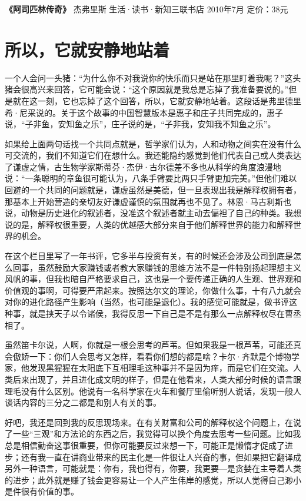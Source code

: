 \textbf{《阿司匹林传奇》} 杰弗里斯 生活·读书·新知三联书店 2010年7月
定价：38元

\section{所以，它就安静地站着}

一个人会问一头猪：``为什么你不对我说你的快乐而只是站在那里盯着我呢？''这头猪会很高兴来回答，它可能会说：``这个原因就是我总是忘掉了我准备要说的。''但是就在这一刻，它也忘掉了这个回答，所以，它就安静地站着。这段话是弗里德里希·尼采说的。关于这个故事的中国智慧版本是惠子和庄子共同完成的，惠子说，``子非鱼，安知鱼之乐''，庄子说的是，``子非我，安知我不知鱼之乐''。

如果给上面两句话找一个共同点就是，哲学家们认为，人和动物之间实在没有什么可交流的，我们不知道它们在想什么。我还能隐约感觉到他们代表自己或人类表达了谦虚之情，古生物学家斯蒂芬·杰伊·古尔德差不多也从科学的角度浪漫地说：``一条聪明的章鱼很可能认为，八条手臂要比两只手臂更加完美。''但他们难以回避的一个共同的问题就是，谦虚虽然是美德，但一旦表现出我是解释权拥有者，那基本上开始营造的亲切友好谦虚谨慎的氛围就再也不见了。林恩·马古利斯也说，动物是历史进化的叙述者，没准这个叙述者就主动去偏袒了自己的种类。我想说的是，解释权很重要，人类的优越感大部分来自于他们解释世界的能力和解释世界的机会。

在这个栏目里写了一年书评，它多半与投资有关，有的时候还会涉及公司到底是怎么回事，虽然鼓励大家赚钱或者教大家赚钱的思维方法不是一件特别扬起理想主义风帆的事，但我也暗自严格要求自己，这也是一个要传递正确的人生观、世界观和价值观的事啊，可得要严肃起来。按照达尔文的理论，你做什么事，十有八九就会对你的进化路径产生影响（当然，也可能是退化）。我的感觉可能就是，做书评这种事，就是挟天子以令诸侯，我得反思一下自己是不是有那么一点解释权尽在曹丞相了。

虽然笛卡尔说，人啊，你就是一根会思考的芦苇。但如果我是一根芦苇，可能还真会傲娇一下：你们人会思考又怎样，看看你们想的都是啥？卡尔·齐默是个博物学家，他发现黑猩猩在太阳底下互相理毛这种事并不是因为痒，而是它们在交流。人类后来出现了，并且进化成文明的样子，但是在他看来，人类大部分时候的语言跟理毛没有什么区别。他说有一名科学家在火车和餐厅里偷听别人说话，发现一般人谈话内容的三分之二都是和别人有关的事。

好吧，我还是回到我的反思现场来。在有关财富和公司的解释权这个问题上，在说了一些``三观''和方法论的东西之后，我觉得可以换个角度去思考一些问题。比如我总是相信勤奋这事很重要，但你可能要反过来想一下，可能正是懒惰才促成了进步；还有我一直在讲商业带来的民主化是一件很让人兴奋的事，但如果把它翻译成另外一种语言，可能就是：你有，我也得有，你要，我更要---是贪婪在主导着人类的进步；此外就是赚了钱会更容易让一个人产生伟岸的感觉，所以人觉得自己渺小是件很有价值的事。

